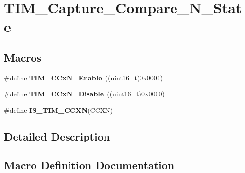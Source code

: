 \hypertarget{group___t_i_m___capture___compare___n___state}{}\section{T\+I\+M\+\_\+\+Capture\+\_\+\+Compare\+\_\+\+N\+\_\+\+State}
\label{group___t_i_m___capture___compare___n___state}
\subsection*{Macros}
\begin{DoxyCompactItemize}
\item 
\hypertarget{group___t_i_m___capture___compare___n___state_gab534ddf23d317eb912564292c1cede2d}{}\#define {\bfseries T\+I\+M\+\_\+\+C\+Cx\+N\+\_\+\+Enable}~((uint16\+\_\+t)0x0004)\label{group___t_i_m___capture___compare___n___state_gab534ddf23d317eb912564292c1cede2d}

\item 
\hypertarget{group___t_i_m___capture___compare___n___state_ga0d7d46aeba33ed197aa39775bc527d7d}{}\#define {\bfseries T\+I\+M\+\_\+\+C\+Cx\+N\+\_\+\+Disable}~((uint16\+\_\+t)0x0000)\label{group___t_i_m___capture___compare___n___state_ga0d7d46aeba33ed197aa39775bc527d7d}

\item 
\#define {\bfseries I\+S\+\_\+\+T\+I\+M\+\_\+\+C\+C\+X\+N}(C\+C\+X\+N)
\end{DoxyCompactItemize}


\subsection{Detailed Description}


\subsection{Macro Definition Documentation}
\hypertarget{group___t_i_m___capture___compare___n___state_gad5a9f961e44c8d7c24066ac37ec79cbc}{}
